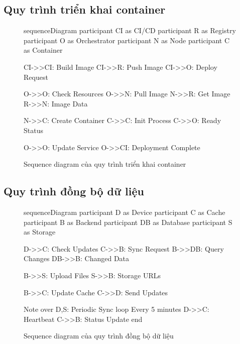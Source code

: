 \subsection{Quy trình triển khai container}
\begin{figure}[h]
\begin{mermaid}
sequenceDiagram
    participant CI as CI/CD
    participant R as Registry
    participant O as Orchestrator
    participant N as Node
    participant C as Container
    
    CI->>CI: Build Image
    CI->>R: Push Image
    CI->>O: Deploy Request
    
    O->>O: Check Resources
    O->>N: Pull Image
    N->>R: Get Image
    R->>N: Image Data
    
    N->>C: Create Container
    C->>C: Init Process
    C->>O: Ready Status
    
    O->>O: Update Service
    O->>CI: Deployment Complete
\end{mermaid}
\caption{Sequence diagram của quy trình triển khai container}
\end{figure}

\subsection{Quy trình đồng bộ dữ liệu}
\begin{figure}[h]
\begin{mermaid}
sequenceDiagram
    participant D as Device
    participant C as Cache
    participant B as Backend
    participant DB as Database
    participant S as Storage
    
    D->>C: Check Updates
    C->>B: Sync Request
    B->>DB: Query Changes
    DB->>B: Changed Data
    
    B->>S: Upload Files
    S->>B: Storage URLs
    
    B->>C: Update Cache
    C->>D: Send Updates
    
    Note over D,S: Periodic Sync
    loop Every 5 minutes
        D->>C: Heartbeat
        C->>B: Status Update
    end
\end{mermaid}
\caption{Sequence diagram của quy trình đồng bộ dữ liệu}
\end{figure} 